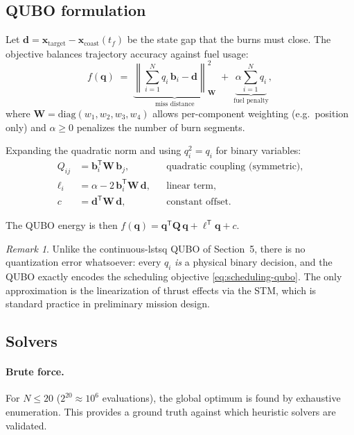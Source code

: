 \documentclass[8pt,a4paper]{article}
\newcommand{\bvec}[1]{\bm{#1}}
\newcommand{\xvec}{\bvec{x}}
\newcommand{\Qmat}{\bvec{Q}}
\newcommand{\TT}{^{\mathsf{T}}}
\theoremstyle{definition}
\theoremstyle{remark}
\newtheorem*{remark}{Remark}
\begin{document}
\subsection{QUBO formulation}

Let $\bvec d = \xvec_{\mathrm{target}} - \xvec_{\mathrm{coast}}(t_f)$
be the state gap that the burns must close.  The objective balances
trajectory accuracy against fuel usage:
\begin{equation}\label{eq:scheduling-qubo}
  f(\bvec q) \;=\;
  \underbrace{
    \left\|\sum_{i=1}^{N} q_i\, \bvec b_i - \bvec d\right\|_{\bvec W}^2
  }_{\text{miss distance}}
  \;+\;
  \underbrace{
    \alpha \sum_{i=1}^{N} q_i
  }_{\text{fuel penalty}},
\end{equation}
where $\bvec W = \mathrm{diag}(w_1, w_2, w_3, w_4)$ allows
per-component weighting (e.g.\ position only) and $\alpha \ge 0$
penalizes the number of burn segments.

Expanding the quadratic norm and using $q_i^2 = q_i$ for binary
variables:
\begin{align}
  Q_{ij} &= \bvec b_i\TT \bvec W\, \bvec b_j,
    &&\text{quadratic coupling (symmetric)},
    \label{eq:Q-scheduling}\\
  \ell_i &= \alpha - 2\,\bvec b_i\TT \bvec W\, \bvec d,
    &&\text{linear term},
    \label{eq:ell-scheduling}\\
  c &= \bvec d\TT \bvec W\, \bvec d,
    &&\text{constant offset.}
    \label{eq:const-scheduling}
\end{align}

The QUBO energy is then
$f(\bvec q) = \bvec q\TT \Qmat\, \bvec q + \bm\ell\TT \bvec q + c$.

\begin{remark}
Unlike the continuous-lstsq QUBO of Section~5, there is no
quantization error whatsoever: every $q_i$ \emph{is} a physical
binary decision, and the QUBO exactly encodes the scheduling
objective \eqref{eq:scheduling-qubo}.  The only approximation is
the linearization of thrust effects via the STM, which is standard
practice in preliminary mission design.
\end{remark}

\subsection{Solvers}

\paragraph{Brute force.}
For $N \le 20$ ($2^{20} \approx 10^6$ evaluations), the global
optimum is found by exhaustive enumeration.  This provides a ground
truth against which heuristic solvers are validated.
\end{document}
